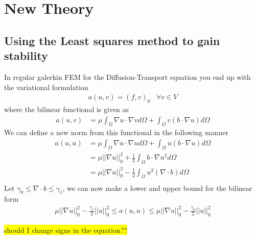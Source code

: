 
\chapter{New Theory} %

\label{chap:newTheory} %


\section{Using the Least squares method to gain stability}

In regular galerkin FEM for the Diffusion-Transport equation you end up with the variational formulation 
\begin{align}
	a(u,v) = (f,v)_0 \; \; \; \forall v \in V
	\label{eq:varFormDiffFEM}
\end{align}
where the bilinear functional is given as 
\begin{align}
	a(u,v) &= \mu\int_{\Omega}\nabla u \cdot \nabla v d\Omega 
	+ \int_{\Omega} v (b \cdot \nabla u) d \Omega
	\label{eq:bilinearFunctional}
\end{align}
We can define a new norm from this functional in the following manner
\begin{align}
	a(u,u) &= \mu\int_{\Omega}\nabla u \cdot \nabla u d\Omega 
	+ \int_{\Omega} u (b \cdot \nabla u) d \Omega\\
	       &= \mu||\nabla u||^2_0 
	+ \frac{1}{2}\int_{\Omega} b \cdot \nabla u^2 d \Omega \\
	       &= \mu||\nabla u||^2_0 
	- \frac{1}{2}\int_{\Omega} u^2  (\nabla \cdot b)  d \Omega \\
	\label{eq:bilinearFunctional}
\end{align}
Let $\gamma_0 \leq \nabla \cdot b \leq \gamma_1 $, we can now make a lower and upper bound for the bilinear form 
\begin{align}
	\mu||\nabla u||^2_0 - \frac{\gamma_1}{2}||u||^2_0 \leq a(u,u) \leq \mu||\nabla u||^2_0 - \frac{\gamma_0}{2}||u||^2_0
	\label{eq:bilinearOperatorBounds}
\end{align}

\colorbox{yellow}{should I change signs in the equation?? } 

